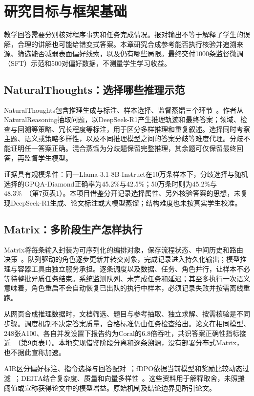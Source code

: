 \section{研究目标与框架基础}
教学回答需要分别核对程序事实和任务完成情况。报对输出不等于解释了学生的误解，合理的讲解也可能给错变式答案。本章研究合成参考能否执行核验并追溯来源、筛选能否减弱表面偏好线索，以及仍有哪些局限。最终交付1000条监督微调（SFT）示范和500对偏好数据，不测量学生学习收益。

\subsection{NaturalThoughts：选择哪些推理示范}
NaturalThoughts包含推理生成与标注、样本选择、监督蒸馏三个环节~\cite{nat}。作者从NaturalReasoning抽取问题，以DeepSeek-R1产生推理轨迹和最终答案；领域、检查与回溯等策略、冗长程度等标注，用于区分多样推理和重复叙述。选择同时考察主题、语义或策略多样性，以及不同推理模型之间的答案分歧等难度代理。分歧不能证明任一答案正确。混合蒸馏为分歧题保留完整推理，其余题可仅保留最终回答，再监督学生模型。

证据具有规模条件：同一Llama-3.1-8B-Instruct在10万条样本下，分歧选择与随机选择的GPQA-Diamond正确率为45.2\%与42.5\%；50万条时则为45.2\%与48.3\%~\cite{nat}（第7页表1）。本项目借鉴分开记录选择属性、另外核验答案的思想，未复现DeepSeek-R1生成、论文标注或大模型蒸馏；结构难度也未按真实学生校准。

\subsection{Matrix：多阶段生产怎样执行}
Matrix将每条输入封装为可序列化的编排对象，保存流程状态、中间历史和路由决策~\cite{matrix}。队列驱动的角色逐步更新并转交对象，完成记录进入持久化输出；模型推理与容器工具由独立服务承担。逐条调度以及数据、任务、角色并行，让样本不必等待整批异质任务结束。系统监测队列、未完成任务和延迟；其至多执行一次语义意味着，角色重启不会自动恢复已出队的执行中样本，必须记录失败并按需离线重跑。

从网页合成推理数据时，文档筛选、题目与参考抽取、独立求解、按需核验是不同步骤。调度机制不决定答案质量，合格标准仍由任务检查给出。论文在相同模型、248张A100、各自并发设置下报告约为Coral的6.8倍吞吐，共识答案正确性指标接近~\cite{matrix}（第9页表1）。本地实现借鉴阶段分离和逐条溯源，没有部署分布式Matrix，也不据此宣称加速。

AIR区分偏好标注、指令选择与回答配对~\cite{air}；fDPO依据当前模型和奖励比较动态过滤~\cite{fdpo}；DEITA结合复杂度、质量和向量多样性~\cite{deita}。这些资料用于解释取舍，未照搬阈值或宣称获得论文中的模型增益。原始机制及结论边界见所引论文。

